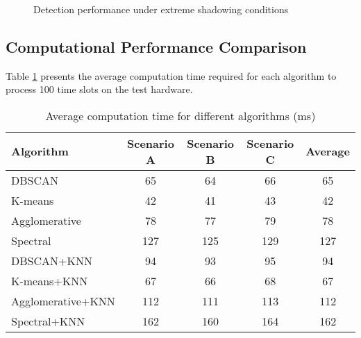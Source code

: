 \begin{figure}[htbp]
    \centering
    \caption{Detection performance under extreme shadowing conditions}
    \label{fig:extreme_shadowing}
\end{figure}

\subsection{Computational Performance Comparison}

Table \ref{tab:computation_time} presents the average computation time required for each algorithm to process 100 time slots on the test hardware.

\begin{table}[htbp]
    \centering
    \caption{Average computation time for different algorithms (ms)}
    \label{tab:computation_time}
    \begin{tabular}{lcccc}
        \toprule
        \textbf{Algorithm} & \textbf{Scenario A} & \textbf{Scenario B} & \textbf{Scenario C} & \textbf{Average} \\
        \midrule
        DBSCAN & 65 & 64 & 66 & 65 \\
        K-means & 42 & 41 & 43 & 42 \\
        Agglomerative & 78 & 77 & 79 & 78 \\
        Spectral & 127 & 125 & 129 & 127 \\
        \midrule
        DBSCAN+KNN & 94 & 93 & 95 & 94 \\
        K-means+KNN & 67 & 66 & 68 & 67 \\
        Agglomerative+KNN & 112 & 111 & 113 & 112 \\
        Spectral+KNN & 162 & 160 & 164 & 162 \\
        \bottomrule
    \end{tabular}
\end{table}

